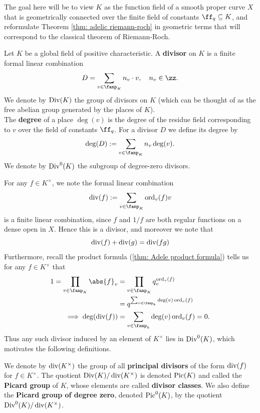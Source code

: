 \documentclass[11pt, x11names, openany]{book}
\begin{document}
The goal here will be to view $K$ as the function field of a smooth proper curve $X$ that is geometrically connected over the finite field of constants $\ff_q \subseteq K$, and reformulate Theorem \ref{thm: adelic riemann-roch} in geometric terms that will correspond to the classical theorem of Riemann-Roch.
\begin{defn}
\label{def: divisors and degree}
Let $K$ be a global field of positive characteristic. A \textbf{divisor} on $K$ is a finite formal linear combination
\begin{equation*}
    D = \sum_{v \in \fanp_K} n_v \cdot v, \quad n_v \in \zz .
\end{equation*}
We denote by $\operatorname{Div}(K)$ the group of divisors on $K$ (which can be thought of as the free abelian group generated by the places of $K$).\\
The \textbf{degree} of a place $\deg(v)$ is the degree of the residue field corresponding to $v$ over the field of constants $\ff_q$. For a divisor $D$ we define its degree by
\begin{equation*}
    \deg(D) := \sum_{v \in \fanp_K} n_v \deg(v).
\end{equation*} 
We denote by $\operatorname{Div}^0(K)$ the subgroup of degree-zero divisors.
\end{defn} 


For any $f \in K^\times$, we note the formal linear combination
\begin{equation}
    \label{eqn: principal divisor example}
    \smalldiv(f) := \sum_{v \in \fanp_K} \ord_v(f) v
\end{equation}
is a finite linear combination, since $f$ and $1/f$ are both regular functions on a dense open in $X$. Hence this is a divisor, and moreover we note that
\begin{equation*}
    \operatorname{div}(f) + \operatorname{div}(g) = \operatorname{div}(fg)
\end{equation*}
Furthermore, recall the product formula (\ref{thm: Adele product formula}) tells us for any $f \in K^\times$ that
\begin{align*}
1 = \prod_{v \in \fanp_K} \abs{f}_v &= \prod_{v \in \fanp_K} q_v^{\ord_v(f)}\\
&= q^{\sum_{v \in \fanp_k} \deg(v) \ord_v(f)}\\
\implies \deg(\smalldiv(f)) &= \sum_{v \in \fanp_k} \deg(v) \ord_v(f) = 0.
\end{align*}
Thus any such divisor induced by an element of $K^\times$ lies in $\operatorname{Div}^0(K)$, which motivates the following definitions.
\begin{defn}
\label{def: principal divisors and pic}
We denote by $\operatorname{div}(K^\times)$ the group of all \textbf{principal divisors} of the form $\operatorname{div}(f)$ for $f \in K^\times$. The quotient $\operatorname{Div}(K)/\operatorname{div}(K^\times)$ is denoted $\operatorname{Pic}(K)$ and called the \textbf{Picard group} of $K$, whose elements are called \textbf{divisor classes}. We also define the \textbf{Picard group of degree zero}, denoted $\operatorname{Pic}^0(K)$, by the quotient $\operatorname{Div}^0(K)/\operatorname{div}(K^\times)$.
\end{defn}
\end{document}
